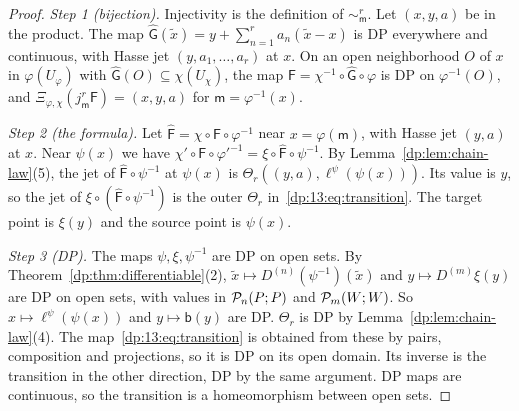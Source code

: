 \begin{proof}
\emph{Step 1 (bijection).} Injectivity is the definition of $\sim^r_{\mathsf m}$. Let $(x,y,a)$ be in the product. The map $\hat{\mathsf G}(\tilde x)=y+\sum_{n=1}^ra_n(\tilde x-x)$ is DP everywhere and continuous, with Hasse jet $(y,a_1,\dots,a_r)$ at $x$. On an open neighborhood $O$ of $x$ in $\varphi(U_\varphi)$ with $\hat{\mathsf G}(O)\subseteq\chi(U_\chi)$, the map $\mathsf F=\chi^{-1}\circ\hat{\mathsf G}\circ\varphi$ is DP on $\varphi^{-1}(O)$, and $\Xi_{\varphi,\chi}(j^r_{\mathsf m}\mathsf F)=(x,y,a)$ for $\mathsf m=\varphi^{-1}(x)$.

\emph{Step 2 (the formula).} Let $\hat{\mathsf F}=\chi\circ\mathsf F\circ\varphi^{-1}$ near $x=\varphi(\mathsf m)$, with Hasse jet $(y,a)$ at $x$. Near $\psi(x)$ we have $\chi'\circ\mathsf F\circ\varphi'^{-1}=\xi\circ\hat{\mathsf F}\circ\psi^{-1}$. By Lemma~\ref{dp:lem:chain-law}(5), the jet of $\hat{\mathsf F}\circ\psi^{-1}$ at $\psi(x)$ is $\Theta_r((y,a),\ell^\psi(\psi(x)))$. Its value is $y$, so the jet of $\xi\circ(\hat{\mathsf F}\circ\psi^{-1})$ is the outer $\Theta_r$ in~\eqref{dp:13:eq:transition}. The target point is $\xi(y)$ and the source point is $\psi(x)$.

\emph{Step 3 (DP).} The maps $\psi,\xi,\psi^{-1}$ are DP on open sets. By Theorem~\ref{dp:thm:differentiable}(2), $\tilde x\mapsto D^{(n)}(\psi^{-1})(\tilde x)$ and $y\mapsto D^{(m)}\xi(y)$ are DP on open sets, with values in $\mathcal P_n(P;P)$ and $\mathcal P_m(W;W)$. So $x\mapsto\ell^\psi(\psi(x))$ and $y\mapsto\mathsf b(y)$ are DP. $\Theta_r$ is DP by Lemma~\ref{dp:lem:chain-law}(4). The map~\eqref{dp:13:eq:transition} is obtained from these by pairs, composition and projections, so it is DP on its open domain. Its inverse is the transition in the other direction, DP by the same argument. DP maps are continuous, so the transition is a homeomorphism between open sets.
\end{proof}

